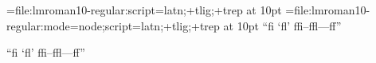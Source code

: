 

\font\testa={file:lmroman10-regular:script=latn;+tlig;+trep}           at 10pt
\font\testb={file:lmroman10-regular:mode=node;script=latn;+tlig;+trep} at 10pt
\testa ``fi `fl' ffi--ffl---ff'' \par
\testb ``fi `fl' ffi--ffl---ff'' \par
\bye
